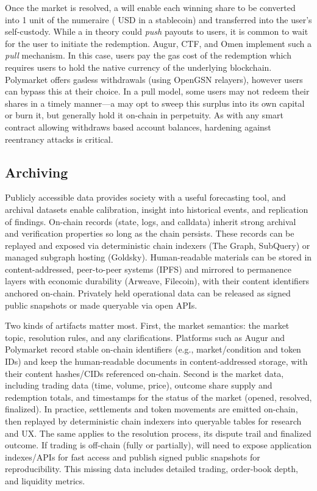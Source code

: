 
Once the market is resolved, a \depm will enable each winning share to be converted into 1 unit of the numeraire ( USD in a stablecoin) and transferred into the user's self-custody. While a \depm in theory could \textit{push} payouts to users, it is common to wait for the user to initiate the redemption. Augur, CTF, and Omen implement such a \textit{pull} mechanism. In this case, users pay the gas cost of the redemption which requires users to hold the native currency of the underlying blockchain. Polymarket offers gasless withdrawals (using OpenGSN relayers), however users can bypass this at their choice. In a pull model, some users may not redeem their shares in a timely manner---a \depm may opt to sweep this surplus into its own capital or burn it, but \depms generally hold it on-chain in perpetuity. As with any smart contract allowing withdraws based account balances, hardening against reentrancy attacks is critical.



\subsection{Archiving}\label{wf:archive}

Publicly accessible \depm data provides society with a useful forecasting tool, and archival datasets enable calibration, insight into historical events, and replication of findings. On-chain records (state, logs, and calldata) inherit strong archival and verification properties so long as the chain persists. These records can be replayed and exposed via deterministic chain indexers (\eg The Graph, SubQuery) or managed subgraph hosting (\eg Goldsky). Human-readable materials can be stored in content-addressed, peer-to-peer systems (\eg IPFS) and mirrored to permanence layers with economic durability (\eg Arweave, Filecoin), with their content identifiers anchored on-chain. Privately held operational data can be released as signed public snapshots or made queryable via open APIs.

Two kinds of artifacts matter most. First, the market semantics: the market topic, resolution rules, and any clarifications. Platforms such as Augur and Polymarket record stable on-chain identifiers (e.g., market/condition and token IDs) and keep the human-readable documents in content-addressed storage, with their content hashes/CIDs referenced on-chain. Second is the market data, including trading data (time, volume, price), outcome share supply and redemption totals, and timestamps for the status of the market (\eg opened, resolved, finalized). In practice, settlements and token movements are emitted on-chain, then replayed by deterministic chain indexers into queryable tables for research and UX. The same applies to the resolution process, its dispute trail and finalized outcome. If trading is off-chain (fully or partially), \depms will need to expose application indexes/APIs for fast access and publish signed public snapshots for reproducibility. This missing data includes detailed trading, order-book depth, and liquidity metrics.

